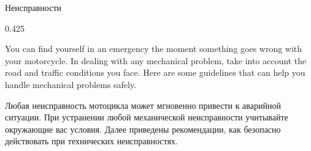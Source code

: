 

 {Неисправности}





\begin{langblock}{0.425}
	\begin{eng}
	
	You can find yourself in an emergency the moment something goes wrong with your motorcycle. In dealing with any mechanical problem, take into account the road and traffic conditions you face. Here are some guidelines that can help you handle mechanical problems safely.
	\end{eng}
	\begin{rus}
		Любая неисправность мотоцикла может мгновенно привести к аварийной ситуации. При устранении любой механической неисправности учитывайте окружающие вас условия. Далее приведены рекомендации, как безопасно действовать при технических неисправностях.
\end{rus}
\end{langblock}





